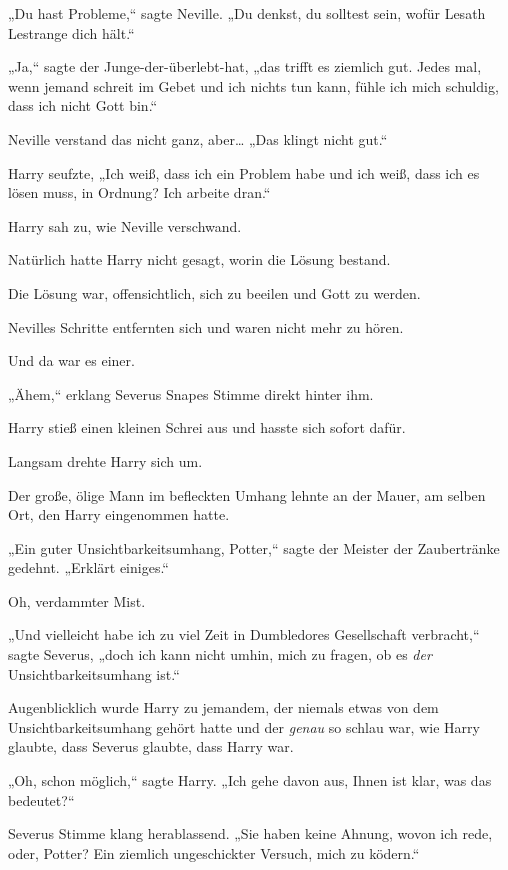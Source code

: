 {„Du hast Probleme,“ sagte Neville. „Du denkst, du solltest sein, wofür Lesath Lestrange dich hält.“

„Ja,“ sagte der Junge-der-überlebt-hat, „das trifft es ziemlich gut. Jedes mal, wenn jemand schreit im Gebet und ich nichts tun kann, fühle ich mich schuldig, dass ich nicht Gott bin.“

Neville verstand das nicht ganz, aber… „Das klingt nicht gut.“

Harry seufzte, „Ich weiß, dass ich ein Problem habe und ich weiß, dass ich es lösen muss, in Ordnung? Ich arbeite dran.“

\later

Harry sah zu, wie Neville verschwand.

Natürlich hatte Harry nicht gesagt, worin die Lösung bestand.

Die Lösung war, offensichtlich, sich zu beeilen und Gott zu werden.

Nevilles Schritte entfernten sich und waren nicht mehr zu hören.

Und da war es einer.

„Ähem,“ erklang Severus Snapes Stimme direkt hinter ihm.

Harry stieß einen kleinen Schrei aus und hasste sich sofort dafür.

Langsam drehte Harry sich um.

Der große, ölige Mann im befleckten Umhang lehnte an der Mauer, am selben Ort, den Harry eingenommen hatte.

„Ein guter Unsichtbarkeitsumhang, Potter,“ sagte der Meister der Zaubertränke gedehnt. „Erklärt einiges.“

Oh, verdammter Mist.

„Und vielleicht habe ich zu viel Zeit in Dumbledores Gesellschaft verbracht,“ sagte Severus, „doch ich kann nicht umhin, mich zu fragen, ob es \emph{der} Unsichtbarkeitsumhang ist.“

Augenblicklich wurde Harry zu jemandem, der niemals etwas von dem Unsichtbarkeitsumhang gehört hatte und der \emph{genau} so schlau war, wie Harry glaubte, dass Severus glaubte, dass Harry war.

„Oh, schon möglich,“ sagte Harry. „Ich gehe davon aus, Ihnen ist klar, was das bedeutet?“

Severus Stimme klang herablassend. „Sie haben keine Ahnung, wovon ich rede, oder, Potter? Ein ziemlich ungeschickter Versuch, mich zu ködern.“

}
